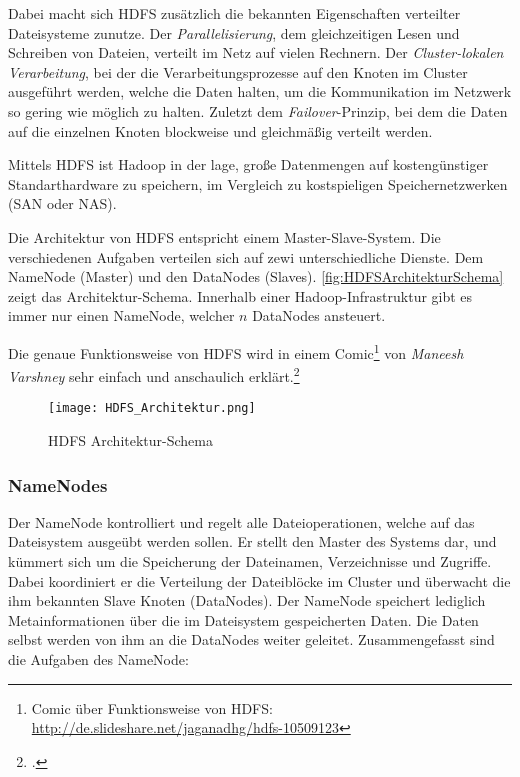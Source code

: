 Dabei macht sich \ac{HDFS} zusätzlich die bekannten Eigenschaften verteilter Dateisysteme zunutze. Der \textit{Parallelisierung}, dem gleichzeitigen Lesen und Schreiben von Dateien, verteilt im Netz auf vielen Rechnern. Der \textit{Cluster-lokalen Verarbeitung}, bei der die Verarbeitungsprozesse auf den Knoten im Cluster ausgeführt werden, welche die Daten halten, um die Kommunikation im Netzwerk so gering wie möglich zu halten. Zuletzt dem \textit{Failover}-Prinzip, bei dem die Daten auf die einzelnen Knoten blockweise und gleichmäßig verteilt werden.

Mittels \ac{HDFS} ist Hadoop in der lage, große Datenmengen auf kostengünstiger Standarthardware zu speichern, im Vergleich zu kostspieligen Speichernetzwerken (\ac{SAN} oder \ac{NAS}). 

Die Architektur von \ac{HDFS} entspricht einem Master-Slave-System. Die verschiedenen Aufgaben verteilen sich auf zewi unterschiedliche Dienste. Dem NameNode (Master) und den DataNodes (Slaves). \autoref{fig:HDFSArchitekturSchema} zeigt das Architektur-Schema. Innerhalb einer Hadoop-Infrastruktur gibt es immer nur einen NameNode, welcher $n$ DataNodes ansteuert.

Die genaue Funktionsweise von \ac{HDFS} wird in einem Comic\footnote{Comic über Funktionsweise von HDFS: \\ \url{http://de.slideshare.net/jaganadhg/hdfs-10509123}} von \textit{Maneesh Varshney} sehr einfach und anschaulich erklärt.\footcite[Vgl.][S. 22 f.]{Wartala.2012}

\begin{figure}[h]
	\centering
	\texttt{[image: HDFS\_Architektur.png]}
	\caption{HDFS Architektur-Schema\footnotemark}
	\label{fig:HDFSArchitekturSchema}
\end{figure}

\subsubsection{NameNodes}
Der NameNode kontrolliert und regelt alle Dateioperationen, welche auf das Dateisystem ausgeübt werden sollen. Er stellt den Master des Systems dar, und kümmert sich um die Speicherung der Dateinamen, Verzeichnisse und Zugriffe. Dabei koordiniert er die Verteilung der Dateiblöcke im Cluster und überwacht die ihm bekannten Slave Knoten (DataNodes). Der NameNode speichert lediglich Metainformationen über die im Dateisystem gespeicherten Daten. Die Daten selbst werden von ihm an die DataNodes weiter geleitet. Zusammengefasst sind die Aufgaben des NameNode:

